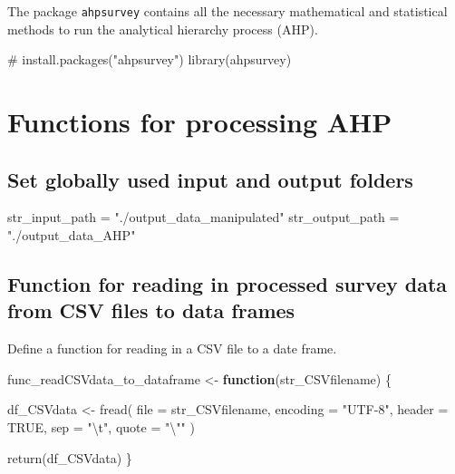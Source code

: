 \documentclass[
]{article}
\newenvironment{Shaded}{\begin{snugshade}}{\end{snugshade}}
\newcommand{\AttributeTok}[1]{\textcolor[rgb]{0.00,0.34,0.68}{#1}}
\newcommand{\CommentTok}[1]{\textcolor[rgb]{0.54,0.53,0.53}{#1}}
\newcommand{\ConstantTok}[1]{\textcolor[rgb]{0.67,0.33,0.00}{#1}}
\newcommand{\ControlFlowTok}[1]{\textcolor[rgb]{0.12,0.11,0.11}{\textbf{#1}}}
\newcommand{\FunctionTok}[1]{\textcolor[rgb]{0.39,0.29,0.61}{#1}}
\newcommand{\NormalTok}[1]{\textcolor[rgb]{0.12,0.11,0.11}{#1}}
\newcommand{\OtherTok}[1]{\textcolor[rgb]{0.00,0.43,0.16}{#1}}
\newcommand{\SpecialCharTok}[1]{\textcolor[rgb]{0.24,0.68,0.91}{#1}}
\newcommand{\StringTok}[1]{\textcolor[rgb]{0.75,0.01,0.01}{#1}}
\begin{document}
The package \texttt{ahpsurvey} contains all the necessary mathematical
and statistical methods to run the analytical hierarchy process (AHP).

\begin{Shaded}
\begin{Highlighting}[]
\CommentTok{\# install.packages("ahpsurvey")}
\FunctionTok{library}\NormalTok{(ahpsurvey)}
\end{Highlighting}
\end{Shaded}

\hypertarget{functions-for-processing-ahp}{%
\section{Functions for processing
AHP}\label{functions-for-processing-ahp}}

\hypertarget{set-globally-used-input-and-output-folders}{%
\subsection{Set globally used input and output
folders}\label{set-globally-used-input-and-output-folders}}

\begin{Shaded}
\begin{Highlighting}[]
\NormalTok{str\_input\_path }\OtherTok{=} \StringTok{"./output\_data\_manipulated"}
\NormalTok{str\_output\_path }\OtherTok{=} \StringTok{"./output\_data\_AHP"}
\end{Highlighting}
\end{Shaded}

\hypertarget{function-for-reading-in-processed-survey-data-from-csv-files-to-data-frames}{%
\subsection{Function for reading in processed survey data from CSV files
to data
frames}\label{function-for-reading-in-processed-survey-data-from-csv-files-to-data-frames}}

Define a function for reading in a CSV file to a date frame.

\begin{Shaded}
\begin{Highlighting}[]
\NormalTok{func\_readCSVdata\_to\_dataframe }\OtherTok{\textless{}{-}} \ControlFlowTok{function}\NormalTok{(str\_CSVfilename) \{}
  
\NormalTok{  df\_CSVdata }\OtherTok{\textless{}{-}} \FunctionTok{fread}\NormalTok{(}
    \AttributeTok{file =}\NormalTok{ str\_CSVfilename, }\AttributeTok{encoding =} \StringTok{"UTF{-}8"}\NormalTok{,}
    \AttributeTok{header =} \ConstantTok{TRUE}\NormalTok{, }\AttributeTok{sep =} \StringTok{"}\SpecialCharTok{\textbackslash{}t}\StringTok{"}\NormalTok{, }\AttributeTok{quote =} \StringTok{"}\SpecialCharTok{\textbackslash{}"}\StringTok{"}
\NormalTok{    )}
  
  \FunctionTok{return}\NormalTok{(df\_CSVdata)}
\NormalTok{\}}
\end{Highlighting}
\end{Shaded}
\end{document}
